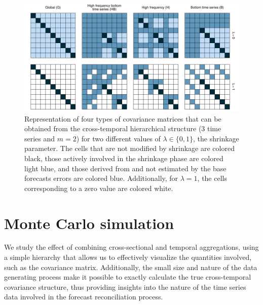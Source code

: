 \documentclass[a4paper,11pt]{article}
\theoremstyle{definition}
\begin{document}
\begin{figure}[!t]
	\centering
	\includegraphics[width = \linewidth]{fig/shr_cov/shr_color.pdf}
	\caption{Representation of four types of covariance matrices that can be obtained from the cross-temporal hierarchical structure ($3$ time series and $m = 2$) for two different values of $\lambda\in\{0,1\}$, the shrinkage parameter. The cells that are not modified by shrinkage are colored black, those actively involved in the shrinkage phase are colored light blue, and those derived from and not estimated by the base forecasts errors are colored blue. Additionally, for $\lambda = 1$, the cells corresponding to a zero value are colored white.}
	\label{fig:shr_grid}
\end{figure}

\section{Monte Carlo simulation}\label{sec:mcsim}

We study the effect of combining cross-sectional and temporal aggregations, using a simple hierarchy that allows us to effectively visualize the quantities involved, such as the covariance matrix. Additionally, the small size and nature of the data generating process make it possible to exactly calculate the true cross-temporal covariance structure, thus providing insights into the nature of the time series data involved in the forecast reconciliation process.
\end{document}
